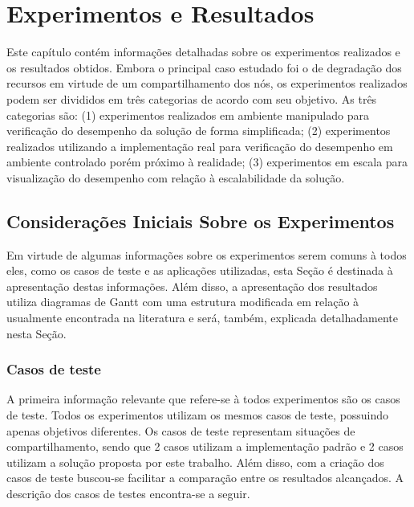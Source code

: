 \chapter{Experimentos e Resultados}
\label{chap:ExpRes}
Este capítulo contém informações detalhadas sobre os experimentos realizados e os resultados obtidos. Embora o principal caso estudado foi o de degradação dos recursos em virtude de um compartilhamento dos nós, os experimentos realizados podem ser divididos em três categorias de acordo com seu objetivo. As três categorias são: (1) experimentos realizados em ambiente manipulado para verificação do desempenho da solução de forma simplificada; (2) experimentos realizados utilizando a implementação real para verificação do desempenho em ambiente controlado porém próximo à realidade; (3) experimentos em escala para visualização do desempenho com relação à escalabilidade da solução.

\section{Considerações Iniciais Sobre os Experimentos}
Em virtude de algumas informações sobre os experimentos serem comuns à todos eles, como os casos de teste e as aplicações utilizadas, esta Seção é destinada à apresentação destas informações. Além disso, a apresentação dos resultados utiliza diagramas de Gantt com uma estrutura modificada em relação à usualmente encontrada na literatura e será, também, explicada detalhadamente nesta Seção.

\subsection{Casos de teste}
\label{sec:casosteste}
A primeira informação relevante que refere-se à todos experimentos são os casos de teste. Todos os experimentos utilizam os mesmos casos de teste, possuindo apenas objetivos diferentes. Os casos de teste representam situações de compartilhamento, sendo que 2 casos utilizam a implementação padrão e 2 casos utilizam a solução proposta por este trabalho. Além disso, com a criação dos casos de teste buscou-se facilitar a comparação entre os resultados alcançados. A descrição dos casos de testes encontra-se a seguir.

